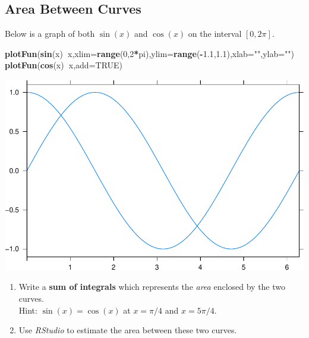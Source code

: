 \documentclass[
]{book}
\newenvironment{Shaded}{\begin{snugshade}}{\end{snugshade}}
\newcommand{\DataTypeTok}[1]{\textcolor[rgb]{0.13,0.29,0.53}{#1}}
\newcommand{\DecValTok}[1]{\textcolor[rgb]{0.00,0.00,0.81}{#1}}
\newcommand{\FloatTok}[1]{\textcolor[rgb]{0.00,0.00,0.81}{#1}}
\newcommand{\KeywordTok}[1]{\textcolor[rgb]{0.13,0.29,0.53}{\textbf{#1}}}
\newcommand{\NormalTok}[1]{#1}
\newcommand{\OperatorTok}[1]{\textcolor[rgb]{0.81,0.36,0.00}{\textbf{#1}}}
\newcommand{\OtherTok}[1]{\textcolor[rgb]{0.56,0.35,0.01}{#1}}
\newcommand{\StringTok}[1]{\textcolor[rgb]{0.31,0.60,0.02}{#1}}
\providecommand{\tightlist}{%
  \setlength{\itemsep}{0pt}\setlength{\parskip}{0pt}}
\begin{document}
\hypertarget{area-between-curves}{%
\subsection{Area Between Curves}\label{area-between-curves}}

Below is a graph of both \(\sin(x)\) and \(\cos(x)\) on the interval \([0,2\pi]\).

\begin{Shaded}
\begin{Highlighting}[]
\KeywordTok{plotFun}\NormalTok{(}\KeywordTok{sin}\NormalTok{(x)}\OperatorTok{~}\NormalTok{x,}\DataTypeTok{xlim=}\KeywordTok{range}\NormalTok{(}\DecValTok{0}\NormalTok{,}\DecValTok{2}\OperatorTok{*}\NormalTok{pi),}\DataTypeTok{ylim=}\KeywordTok{range}\NormalTok{(}\OperatorTok{-}\FloatTok{1.1}\NormalTok{,}\FloatTok{1.1}\NormalTok{),}\DataTypeTok{xlab=}\StringTok{""}\NormalTok{,}\DataTypeTok{ylab=}\StringTok{""}\NormalTok{)}
\KeywordTok{plotFun}\NormalTok{(}\KeywordTok{cos}\NormalTok{(x)}\OperatorTok{~}\NormalTok{x,}\DataTypeTok{add=}\OtherTok{TRUE}\NormalTok{)}
\end{Highlighting}
\end{Shaded}

\begin{center}\includegraphics{_bookdown_files/math135_handbook_files/figure-latex/unnamed-chunk-135-1} \end{center}

\begin{enumerate}
\def\labelenumi{\arabic{enumi}.}
\tightlist
\item
  Write a \textbf{sum of integrals} which represents the \emph{area} enclosed by the two curves.\\
  Hint: \(\sin(x) = \cos(x)\) at \(x=\pi/4\) and \(x=5\pi/4\).
\item
  Use \emph{RStudio} to estimate the area between these two curves.
\end{enumerate}
\end{document}
